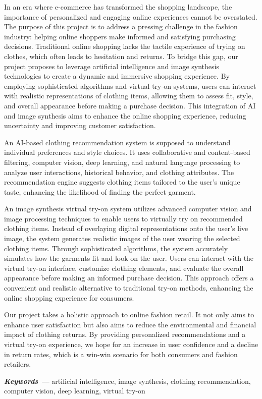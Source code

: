 
In an era where e-commerce has transformed the shopping landscape, the importance of personalized and engaging online experiences cannot be overstated. The purpose of this project is to address a pressing challenge in the fashion industry: helping online shoppers make informed and satisfying purchasing decisions. Traditional online shopping lacks the tactile experience of trying on clothes, which often leads to hesitation and returns. To bridge this gap, our project proposes to leverage artificial intelligence and image synthesis technologies to create a dynamic and immersive shopping experience. By employing sophisticated algorithms and virtual try-on systems, users can interact with realistic representations of clothing items, allowing them to assess fit, style, and overall appearance before making a purchase decision. This integration of AI and image synthesis aims to enhance the online shopping experience, reducing uncertainty and improving customer satisfaction.

An AI-based clothing recommendation system is supposed to understand individual preferences and style choices. It uses collaborative and content-based filtering, computer vision, deep learning, and natural language processing to analyze user interactions, historical behavior, and clothing attributes. The recommendation engine suggests clothing items tailored to the user's unique taste, enhancing the likelihood of finding the perfect garment.

An image synthesis virtual try-on system utilizes advanced computer vision and image processing techniques to enable users to virtually try on recommended clothing items. Instead of overlaying digital representations onto the user's live image, the system generates realistic images of the user wearing the selected clothing items. Through sophisticated algorithms, the system accurately simulates how the garments fit and look on the user. Users can interact with the virtual try-on interface, customize clothing elements, and evaluate the overall appearance before making an informed purchase decision. This approach offers a convenient and realistic alternative to traditional try-on methods, enhancing the online shopping experience for consumers.

Our project takes a holistic approach to online fashion retail. It not only aims to enhance user satisfaction but also aims to reduce the environmental and financial impact of clothing returns. By providing personalized recommendations and a virtual try-on experience, we hope for an increase in user confidence and a decline in return rates, which is a win-win scenario for both consumers and fashion retailers.

\textbf{\textit{Keywords ---}} artificial intelligence, image synthesis, clothing recommendation, computer vision, deep learning, virtual try-on